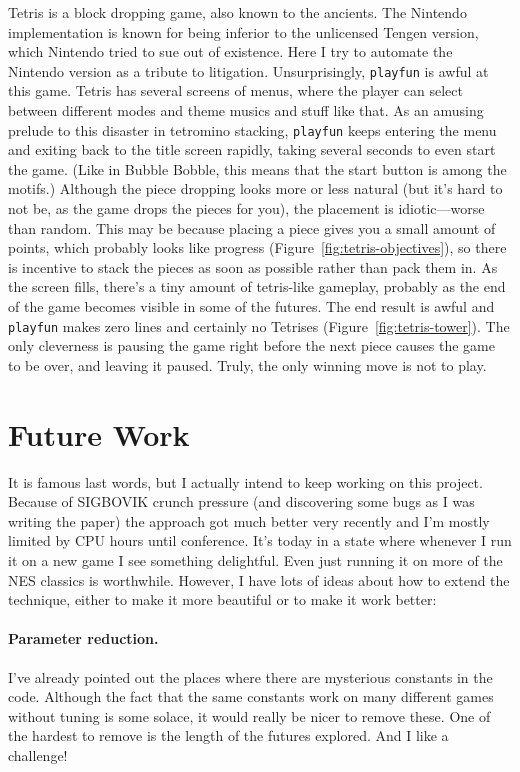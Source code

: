 \documentclass[twocolumn]{article}
\begin{document}
Tetris is a block dropping game, also known to the ancients. The
Nintendo implementation is known for being inferior to the unlicensed
Tengen version, which Nintendo tried to sue out of existence. Here I
try to automate the Nintendo version as a tribute to litigation.
Unsurprisingly, {\tt playfun} is awful at this game. Tetris has
several screens of menus, where the player can select between
different modes and theme musics and stuff like that. As an amusing
prelude to this disaster in tetromino stacking, {\tt playfun} keeps
entering the menu and exiting back to the title screen rapidly, taking
several seconds to even start the game. (Like in Bubble Bobble, this
means that the start button is among the motifs.) Although the piece
dropping looks more or less natural (but it's hard to not be, as the
game drops the pieces for you), the placement is idiotic---worse than
random. This may be because placing a piece gives you a small amount
of points, which probably looks like progress
(Figure~\ref{fig:tetris-objectives}), so there is incentive to stack
the pieces as soon as possible rather than pack them in. As the screen
fills, there's a tiny amount of tetris-like gameplay, probably as the
end of the game becomes visible in some of the futures. The end result
is awful and {\tt playfun} makes zero lines and certainly no Tetrises
(Figure~\ref{fig:tetris-tower}). The only cleverness is pausing the
game right before the next piece causes the game to be over, and
leaving it paused. Truly, the only winning move is not to play.

\section{Future Work}

It is famous last words, but I actually intend to keep working on this
project. Because of SIGBOVIK crunch pressure (and discovering some
bugs as I was writing the paper) the approach got much better very
recently and I'm mostly limited by CPU hours until conference. It's
today in a state where whenever I run it on a new game I see something
delightful. Even just running it on more of the NES classics is
worthwhile. However, I have lots of ideas about how to extend the
technique, either to make it more beautiful or to make it work better:

\paragraph{Parameter reduction.} I've already pointed out the places
where there are mysterious constants in the code. Although the fact
that the same constants work on many different games without tuning
is some solace, it would really be nicer to remove these. One of the
hardest to remove is the length of the futures explored. And I like
a challenge! 
\end{document}

